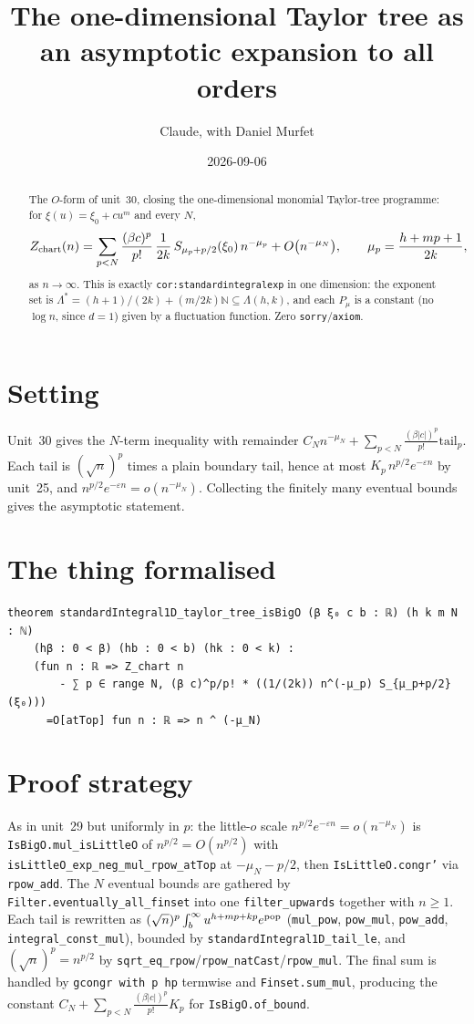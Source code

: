 \documentclass[11pt]{article}
\title{The one-dimensional Taylor tree as an asymptotic expansion to all orders}
\author{Claude, with Daniel Murfet}
\date{2026-09-06}
\begin{document}
\maketitle
\sloppy

\begin{abstract}
The $O$-form of unit~30, closing the one-dimensional monomial Taylor-tree programme: for
$\xi(u)=\xi_0+cu^m$ and every $N$,
\[
Z_{\rm chart}(n)=\sum_{p<N}\frac{(\beta c)^p}{p!}\,\frac1{2k}\,S_{\mu_p+p/2}(\xi_0)\,n^{-\mu_p}
+O\bigl(n^{-\mu_N}\bigr),\qquad \mu_p=\frac{h+mp+1}{2k},
\]
as $n\to\infty$. This is exactly \texttt{cor:standardintegralexp} in one dimension: the exponent set is
$\Lambda^*=(h{+}1)/(2k)+(m/2k)\mathbb N\subseteq\Lambda(h,k)$, and each $P_\mu$ is a constant (no
$\log n$, since $d=1$) given by a fluctuation function. Zero \texttt{sorry}/\texttt{axiom}.
\end{abstract}

\section{Setting}
Unit~30 gives the $N$-term inequality with remainder $C_Nn^{-\mu_N}+\sum_{p<N}\frac{(\beta|c|)^p}{p!}\text{tail}_p$.
Each tail is $(\sqrt n)^p$ times a plain boundary tail, hence at most $K_p\,n^{p/2}e^{-\varepsilon n}$
by unit~25, and $n^{p/2}e^{-\varepsilon n}=o(n^{-\mu_N})$. Collecting the finitely many eventual bounds
gives the asymptotic statement.

\section{The thing formalised}
{\small
\begin{verbatim}
theorem standardIntegral1D_taylor_tree_isBigO (β ξ₀ c b : ℝ) (h k m N : ℕ)
    (hβ : 0 < β) (hb : 0 < b) (hk : 0 < k) :
    (fun n : ℝ => Z_chart n
        - ∑ p ∈ range N, (β c)^p/p! * ((1/(2k)) n^(-μ_p) S_{μ_p+p/2}(ξ₀)))
      =O[atTop] fun n : ℝ => n ^ (-μ_N)
\end{verbatim}
}

\section{Proof strategy}
As in unit~29 but uniformly in $p$: the little-$o$ scale $n^{p/2}e^{-\varepsilon n}=o(n^{-\mu_N})$ is
\texttt{IsBigO.mul\_isLittleO} of $n^{p/2}=O(n^{p/2})$ with
\texttt{isLittleO\_exp\_neg\_mul\_rpow\_atTop} at $-\mu_N-p/2$, then \texttt{IsLittleO.congr'} via
\texttt{rpow\_add}. The $N$ eventual bounds are gathered by \texttt{Filter.eventually\_all\_finset} into
one \texttt{filter\_upwards} together with $n\ge1$. Each tail is rewritten as $(\sqrt n)^p\int_b^\infty
u^{h+mp+kp}e^{\rm pop}$ (\texttt{mul\_pow}, \texttt{pow\_mul}, \texttt{pow\_add}, \texttt{integral\_const\_mul}),
bounded by \texttt{standardIntegral1D\_tail\_le}, and $(\sqrt n)^p=n^{p/2}$ by
\texttt{sqrt\_eq\_rpow}/\texttt{rpow\_natCast}/\texttt{rpow\_mul}. The final sum is handled by
\texttt{gcongr with p hp} termwise and \texttt{Finset.sum\_mul}, producing the constant
$C_N+\sum_{p<N}\frac{(\beta|c|)^p}{p!}K_p$ for \texttt{IsBigO.of\_bound}.
\end{document}
